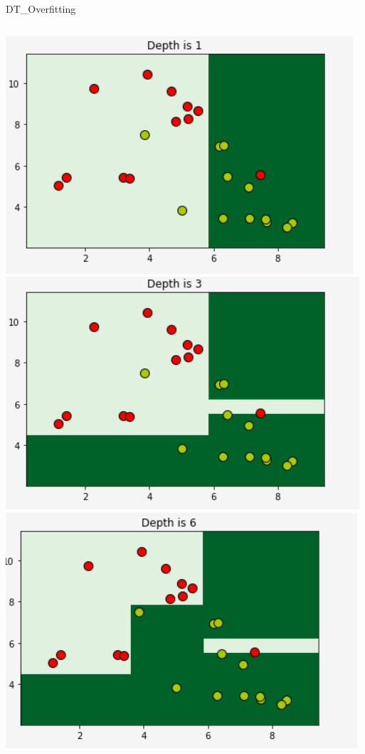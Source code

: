 \documentclass[aspectratio=169, 14pt]{beamer}
\begin{document}
\begin{frame}{DT\_Overfitting}
	\begin{columns}
		\column{5cm}
		\includegraphics[width=\textwidth, height=0.6\textheight]{DT_OF_Images/dtree2_22.png}
		\column{5cm}
		\includegraphics[width=\textwidth, height=0.6\textheight]{DT_OF_Images/dtree2_22a.png}
		\column{5cm}
		\includegraphics[width=\textwidth, height=0.6\textheight]{DT_OF_Images/dtree2_22b.png}

	\end{columns}
\end{frame}
\end{document}
